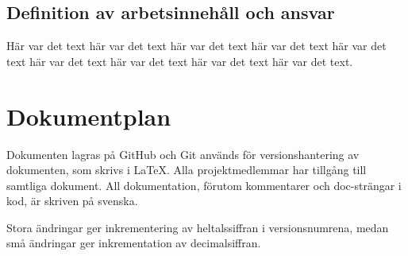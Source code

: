 \documentclass[a4paper,titlepage,12pt]{article}
\begin{document}
	\subsection{Definition av arbetsinnehåll och ansvar}
	Här var det text här var det text här var det text
	här var det text här var det text här var det text
	här var det text här var det text här var det text.
	
	
	\section{Dokumentplan}
    Dokumenten lagras på GitHub och Git används för versionshantering av
    dokumenten, som skrivs i LaTeX. Alla projektmedlemmar har tillgång till
    samtliga dokument. All dokumentation, förutom kommentarer och doc-strängar
    i kod, är skriven på svenska.

    Stora ändringar ger inkrementering av heltalssiffran i versionsnumrena,
    medan små ändringar ger inkrementation av decimalsiffran.
	
\end{document}
